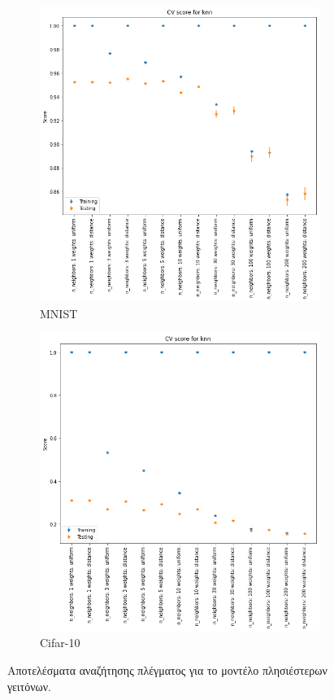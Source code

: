 \documentclass[a4paper]{article}
\begin{document}
\begin{figure}[H]
    \centering

    \begin{subfigure}[t]{0.45\linewidth}
    \includegraphics[width=\linewidth]{figures/mnist/cv_results_knn.png}
    \caption{MNIST}
    \end{subfigure}
    \begin{subfigure}[t]{0.45\linewidth}
    \includegraphics[width=\linewidth]{figures/cifar/cv_results_knn.png}
    \caption{Cifar-10}
    \end{subfigure}

    \caption{Αποτελέσματα αναζήτησης πλέγματος για το μοντέλο πλησιέστερων
    γειτόνων.}
    \label{fig:cv_knn}
\end{figure}
\end{document}

